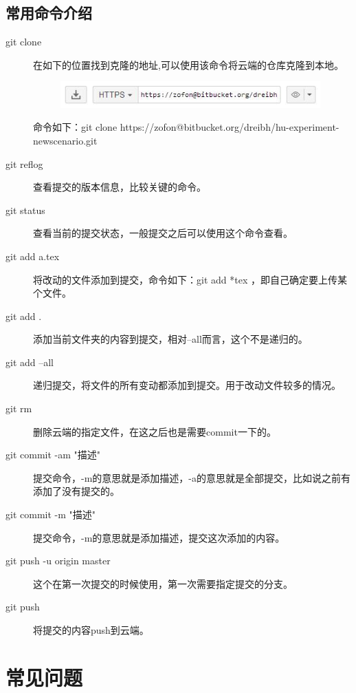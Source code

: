 \documentclass[a4paper,12pt]{ctexbook}
\begin{document}
\section{常用命令介绍}
\begin{description}
  \item[git clone] 在如下的位置找到克隆的地址,可以使用该命令将云端的仓库克隆到本地。
        \begin{figure}[H]
        \centering
        \includegraphics[width=10cm]{figures/clone_address.jpg}
        \end{figure}
        命令如下：git clone https://zofon@bitbucket.org/dreibh/hu-experiment-newscenario.git

  \item[git reflog] 查看提交的版本信息，比较关键的命令。
  \item[git status] 查看当前的提交状态，一般提交之后可以使用这个命令查看。

  \item[git add a.tex] 将改动的文件添加到提交，命令如下：git add *tex ，即自己确定要上传某个文件。
  \item[git add .] 添加当前文件夹的内容到提交，相对--all而言，这个不是递归的。
  \item[git add --all] 递归提交，将文件的所有变动都添加到提交。用于改动文件较多的情况。

  \item[git rm] 删除云端的指定文件，在这之后也是需要commit一下的。

  \item[git commit -am "描述"] 提交命令，-m的意思就是添加描述，-a的意思就是全部提交，比如说之前有添加了没有提交的。
  \item[git commit -m  "描述"] 提交命令，-m的意思就是添加描述，提交这次添加的内容。

  \item[git push -u origin master] 这个在第一次提交的时候使用，第一次需要指定提交的分支。
  \item[git push] 将提交的内容push到云端。
\end{description}

\newpage
\chapter{常见问题}
\end{document}
